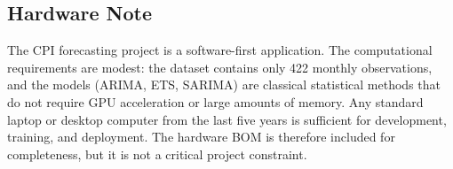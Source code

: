 \subsection{Hardware Note}

The CPI forecasting project is a software-first application. The computational requirements are modest: the dataset contains only 422 monthly observations, and the models (ARIMA, ETS, SARIMA) are classical statistical methods that do not require GPU acceleration or large amounts of memory. Any standard laptop or desktop computer from the last five years is sufficient for development, training, and deployment. The hardware BOM is therefore included for completeness, but it is not a critical project constraint.
